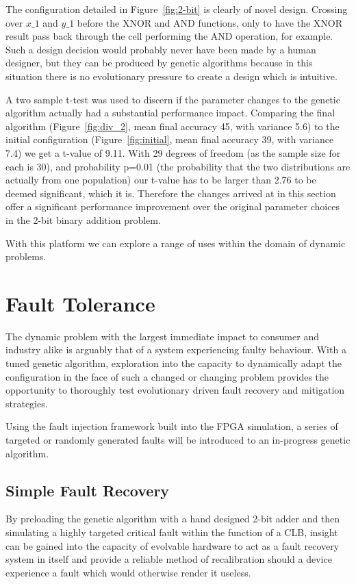 The configuration detailed in Figure~\ref{fig:2-bit} is clearly of novel design.
Crossing over $x\_1$ and $y\_1$ before the XNOR and AND functions, only to have
the XNOR result pass back through the cell performing the AND operation, for example.
Such a design decision would probably never have been made by a human designer,
but they can be produced by genetic algorithms because in this situation there is
no evolutionary pressure to create a design which is intuitive.

A two sample t-test was used to discern if the parameter changes to the genetic
algorithm actually had a substantial performance impact. Comparing the final algorithm
(Figure~\ref{fig:div_2}, mean final accuracy 45, with variance 5.6) to the initial
configuration (Figure~\ref{fig:initial}, mean final accuracy 39, with variance 7.4)
we get a t-value of 9.11. With 29 degrees of freedom (as the sample size for each is 30),
and probability p=0.01 (the probability that the two distributions are actually from
one population)
our t-value has to be larger than 2.76 to be deemed significant, which it is.
Therefore the changes arrived at in this section offer a significant performance improvement
over the original parameter choices in the 2-bit binary addition problem.

With this platform we can explore
a range of uses within the domain of dynamic problems.

\section{Fault Tolerance}

The dynamic problem with the largest immediate impact to consumer and industry
alike is arguably that of a system experiencing faulty behaviour.
With a tuned genetic algorithm, exploration into the capacity to dynamically
adapt the configuration in the face of such a changed or changing problem provides
the opportunity to thoroughly test evolutionary driven fault recovery and mitigation
strategies.

Using the fault injection framework built into the FPGA simulation, a series
of targeted or randomly generated faults will be introduced to an in-progress
genetic algorithm.

\subsection{Simple Fault Recovery \label{ss:simple_f}}

By preloading the genetic algorithm with a hand designed 2-bit adder
and then
simulating a highly targeted critical fault within the function of a CLB, insight
can be gained into the capacity of evolvable hardware to act as a fault recovery
system in itself and provide a reliable method of recalibration should a device
experience a fault which would otherwise render it useless.

